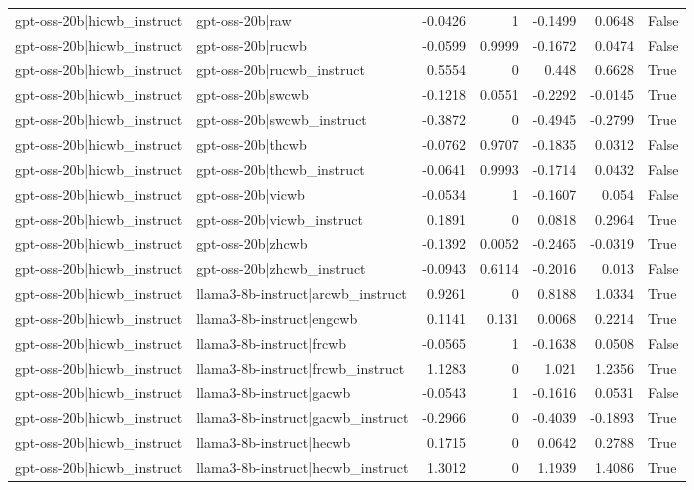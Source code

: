 \begin{table}
\begin{tabular}{l l r r r r l}
gpt-oss-20b|hicwb_instruct & gpt-oss-20b|raw & -0.0426 & 1 & -0.1499 & 0.0648 & False \\
gpt-oss-20b|hicwb_instruct & gpt-oss-20b|rucwb & -0.0599 & 0.9999 & -0.1672 & 0.0474 & False \\
gpt-oss-20b|hicwb_instruct & gpt-oss-20b|rucwb_instruct & 0.5554 & 0 & 0.448 & 0.6628 & True \\
gpt-oss-20b|hicwb_instruct & gpt-oss-20b|swcwb & -0.1218 & 0.0551 & -0.2292 & -0.0145 & True \\
gpt-oss-20b|hicwb_instruct & gpt-oss-20b|swcwb_instruct & -0.3872 & 0 & -0.4945 & -0.2799 & True \\
gpt-oss-20b|hicwb_instruct & gpt-oss-20b|thcwb & -0.0762 & 0.9707 & -0.1835 & 0.0312 & False \\
gpt-oss-20b|hicwb_instruct & gpt-oss-20b|thcwb_instruct & -0.0641 & 0.9993 & -0.1714 & 0.0432 & False \\
gpt-oss-20b|hicwb_instruct & gpt-oss-20b|vicwb & -0.0534 & 1 & -0.1607 & 0.054 & False \\
gpt-oss-20b|hicwb_instruct & gpt-oss-20b|vicwb_instruct & 0.1891 & 0 & 0.0818 & 0.2964 & True \\
gpt-oss-20b|hicwb_instruct & gpt-oss-20b|zhcwb & -0.1392 & 0.0052 & -0.2465 & -0.0319 & True \\
gpt-oss-20b|hicwb_instruct & gpt-oss-20b|zhcwb_instruct & -0.0943 & 0.6114 & -0.2016 & 0.013 & False \\
gpt-oss-20b|hicwb_instruct & llama3-8b-instruct|arcwb_instruct & 0.9261 & 0 & 0.8188 & 1.0334 & True \\
gpt-oss-20b|hicwb_instruct & llama3-8b-instruct|engcwb & 0.1141 & 0.131 & 0.0068 & 0.2214 & True \\
gpt-oss-20b|hicwb_instruct & llama3-8b-instruct|frcwb & -0.0565 & 1 & -0.1638 & 0.0508 & False \\
gpt-oss-20b|hicwb_instruct & llama3-8b-instruct|frcwb_instruct & 1.1283 & 0 & 1.021 & 1.2356 & True \\
gpt-oss-20b|hicwb_instruct & llama3-8b-instruct|gacwb & -0.0543 & 1 & -0.1616 & 0.0531 & False \\
gpt-oss-20b|hicwb_instruct & llama3-8b-instruct|gacwb_instruct & -0.2966 & 0 & -0.4039 & -0.1893 & True \\
gpt-oss-20b|hicwb_instruct & llama3-8b-instruct|hecwb & 0.1715 & 0 & 0.0642 & 0.2788 & True \\
gpt-oss-20b|hicwb_instruct & llama3-8b-instruct|hecwb_instruct & 1.3012 & 0 & 1.1939 & 1.4086 & True \\

\end{tabular}
\end{table}
